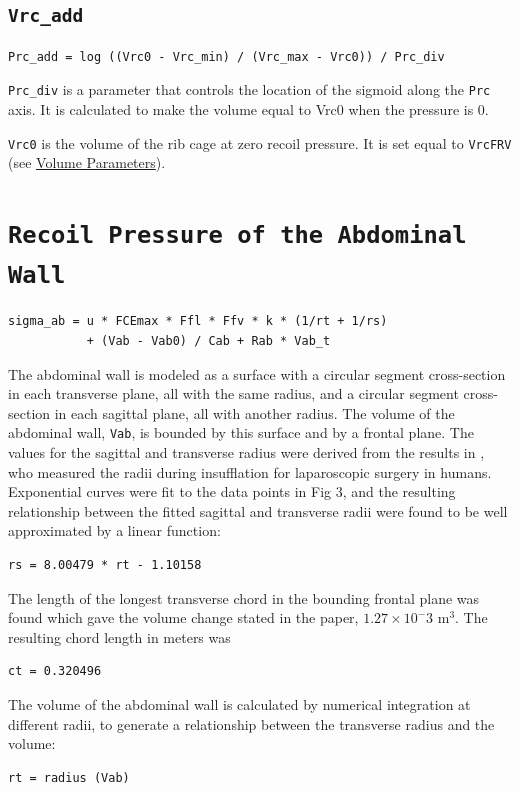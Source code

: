 \documentclass[12pt,openany,oneside]{book}
\begin{document}
\subsection{\texttt{Vrc\_add}}
\begin{verbatim}
Prc_add = log ((Vrc0 - Vrc_min) / (Vrc_max - Vrc0)) / Prc_div
\end{verbatim}
\verb~Prc_div~ is a parameter that controls the location of the
sigmoid along the \verb~Prc~ axis. It is calculated to make the
volume equal to Vrc0 when the pressure is 0.

\verb~Vrc0~ is the volume of the rib cage at zero recoil pressure. It
is set equal to \verb~VrcFRV~ (see
\hyperref[Volume Parameters]{Volume Parameters}).

\section{\texttt{Recoil Pressure of the Abdominal Wall}}
\begin{verbatim}
sigma_ab = u * FCEmax * Ffl * Ffv * k * (1/rt + 1/rs)
           + (Vab - Vab0) / Cab + Rab * Vab_t
\end{verbatim}

The abdominal wall is modeled as a surface with a circular segment
cross-section in each transverse plane, all with the same radius, and
a circular segment cross-section in each sagittal plane, all with
another radius. The volume of the abdominal wall, \verb~Vab~, is
bounded by this surface and by a frontal plane. The values for the
sagittal and transverse radius were derived from the results in
\citet{Song2006}, who measured the radii during insufflation for
laparoscopic surgery in humans. Exponential curves were fit to the
data points in Fig 3, and the resulting relationship between the
fitted sagittal and transverse radii were found to be well
approximated by a linear function:
\begin{verbatim}
rs = 8.00479 * rt - 1.10158
\end{verbatim}
The length of the longest transverse chord in the bounding frontal
plane was found which gave the volume change stated in the paper,
$1.27\times 10^-3$ m$^3$. The resulting chord length in meters was
\begin{verbatim}
ct = 0.320496
\end{verbatim}
The volume of the abdominal wall is calculated by numerical
integration at different radii, to generate a relationship between the
transverse radius and the volume:
\begin{verbatim}
rt = radius (Vab)
\end{verbatim}
\end{document}
